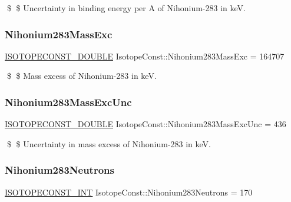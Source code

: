 \$ \$ Uncertainty in binding energy per A of Nihonium-\/283 in keV. \mbox{\label{group___isotope_const-_nihonium-_nh283_ga438ef7d9a22d80516a2df3ab568bd98f}} 
\subsubsection{\texorpdfstring{Nihonium283\+Mass\+Exc}{Nihonium283MassExc}}
{\footnotesize\ttfamily \mbox{\hyperlink{group___isotope_const-_macros_ga8f45a7272ce02c0b4c65c44636ed719a}{I\+S\+O\+T\+O\+P\+E\+C\+O\+N\+S\+T\+\_\+\+D\+O\+U\+B\+LE}} Isotope\+Const\+::\+Nihonium283\+Mass\+Exc = 164707}

\$ \$ Mass excess of Nihonium-\/283 in keV. \mbox{\label{group___isotope_const-_nihonium-_nh283_ga75bef5f770cf0f3efb40264353dc534b}} 
\subsubsection{\texorpdfstring{Nihonium283\+Mass\+Exc\+Unc}{Nihonium283MassExcUnc}}
{\footnotesize\ttfamily \mbox{\hyperlink{group___isotope_const-_macros_ga8f45a7272ce02c0b4c65c44636ed719a}{I\+S\+O\+T\+O\+P\+E\+C\+O\+N\+S\+T\+\_\+\+D\+O\+U\+B\+LE}} Isotope\+Const\+::\+Nihonium283\+Mass\+Exc\+Unc = 436}

\$ \$ Uncertainty in mass excess of Nihonium-\/283 in keV. \mbox{\label{group___isotope_const-_nihonium-_nh283_ga648414256dc1cce66fe58f32abdc3eb2}} 
\subsubsection{\texorpdfstring{Nihonium283\+Neutrons}{Nihonium283Neutrons}}
{\footnotesize\ttfamily \mbox{\hyperlink{group___isotope_const-_macros_ga5f18360b3e99483a35c32d789e62621c}{I\+S\+O\+T\+O\+P\+E\+C\+O\+N\+S\+T\+\_\+\+I\+NT}} Isotope\+Const\+::\+Nihonium283\+Neutrons = 170}

